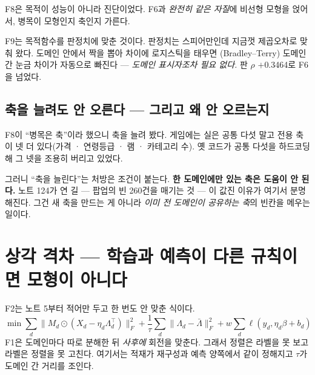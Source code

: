 \documentclass[10pt]{article}
\begin{document}
F8은 목적이 성능이 아니라 진단이었다. F6과 \emph{완전히 같은 자질}에
비선형 모형을 얹어서, 병목이 모형인지 축인지 가른다.


F9는 목적함수를 판정치에 맞춘 것이다. 판정치는 스피어만인데 지금껏 제곱오차로
맞춰 왔다. 도메인 안에서 짝을 뽑아 차이에 로지스틱을 태우면
(Bradley--Terry) 도메인 간 눈금 차이가 자동으로 빠진다 --- \emph{도메인
표시자조차 필요 없다.} 판 $\rho$ $+$0.3464로 F6을 넘었다.

\subsection{축을 늘려도 안 오른다 --- 그리고 왜 안 오르는지}

F8이 ``병목은 축''이라 했으니 축을 늘려 봤다. 게임에는 실은 공통 다섯 말고
전용 축이 넷 더 있다(가격 · 연령등급 · 램 · 카테고리 수). 옛 코드가 공통
다섯을 하드코딩해 그 넷을 조용히 버리고 있었다.


그러니 ``축을 늘린다''는 처방은 조건이 붙는다. \textbf{한 도메인에만 있는
축은 도움이 안 된다.} 노트 124가 연 길 --- 팝업의 빈 260건을 매기는 것 ---
이 값진 이유가 여기서 분명해진다. 그건 새 축을 만드는 게 아니라 \emph{이미
전 도메인이 공유하는 축}의 빈칸을 메우는 일이다.

\section{상각 격차 --- 학습과 예측이 다른 규칙이면 모형이 아니다}

F2는 노트 5부터 적어만 두고 한 번도 안 맞춘 식이다.
\[
\min \sum_d \bigl\| M_d \odot (X_d - \eta_d \Lambda_d^{\!\top}) \bigr\|_F^2
 + \frac{1}{\tau}\sum_d \bigl\| \Lambda_d - \bar\Lambda \bigr\|_F^2
 + w \sum_d \ell(y_d, \eta_d \beta + b_d)
\]
F1은 도메인마다 따로 분해한 뒤 \emph{사후에} 회전을 맞춘다. 그래서 정렬은
라벨을 못 보고 라벨은 정렬을 못 고친다. 여기서는 적재가 재구성과 예측
양쪽에서 같이 정해지고 $\tau$가 도메인 간 거리를 조인다.
\end{document}
